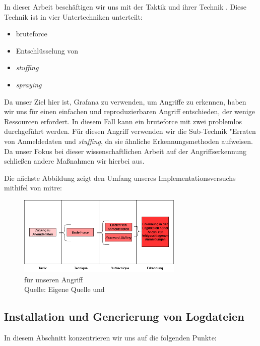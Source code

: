 In dieser Arbeit beschäftigen wir uns mit der Taktik  und ihrer Technik . Diese Technik ist in vier Untertechniken unterteilt:

{
\begin{itemize}[noitemsep]
   \item \gls{bruteforce}
   \item	Entschlüsselung von 
   \item \textit{\gls{stuffing}}
   \item \textit{\gls{spraying}}
\end{itemize}
}

Da unser Ziel hier ist, Grafana zu verwenden, um Angriffe zu erkennen, haben wir uns für einen einfachen und reproduzierbaren Angriff entschieden, der wenige Ressourcen erfordert. In diesem Fall kann ein \gls{bruteforce} mit zwei  problemlos durchgeführt werden. Für diesen Angriff verwenden wir die Sub-Technik "Erraten von Anmeldedaten und \textit{\gls{stuffing}}, da sie ähnliche Erkennungsmethoden aufweisen. Da unser Fokus bei dieser wissenschaftlichen Arbeit auf der Angriffserkennung schließen andere Maßnahmen  wir hierbei aus.

Die nächste Abbildung zeigt den Umfang unseres Implementationsversuchs mithifel von \gls{mitre}:
\begin{figure}[H]
   \centering
   \includegraphics[width=0.7\textwidth]{assets/T1110.drawio.png}
   \caption[ für unseren Angriff]
   { für unseren Angriff \\Quelle: Eigene Quelle und \citep{Mitre_t1110}}
   \centering
\end{figure}

\newpage
\subsection{Installation und Generierung von Logdateien}
In diesem Abschnitt konzentrieren wir uns auf die folgenden Punkte:

